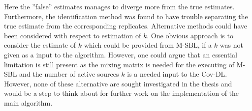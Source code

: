 Here the ''false'' estimates manages to diverge more from the true estimates. 
Furthermore, the identification method was found to have trouble separating the true estimate from the corresponding replicates.
Alternative methods could have been considered with respect to estimation of $k$. 
One obvious approach is to consider the estimate of $k$ which could be provided from M-SBL, if a $k$ was not given as a input to the algorithm. 
However, one could argue that an essential limitation is still present as the mixing matrix is needed for the executing of M-SBL and the number of active sources $k$ is a needed input to the Cov-DL. 
However, none of these alternative are sought investigated in the thesis and would be a step to think about for further work on the implementation of the main algorithm.


      
        


       
 